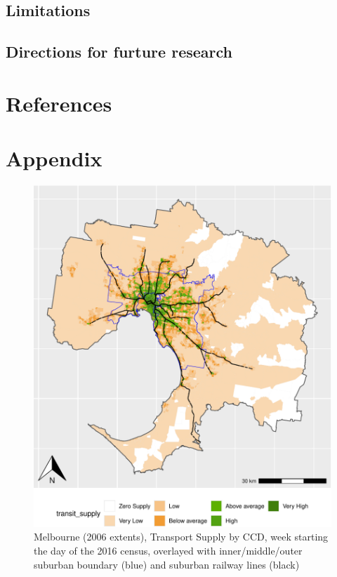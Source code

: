 \documentclass[preprint, 3p,
authoryear]{elsarticle} %
\begin{document}
\hypertarget{limitations}{%
\subsection{Limitations}\label{limitations}}

\hypertarget{directions-for-furture-research}{%
\subsection{Directions for furture
research}\label{directions-for-furture-research}}

\hypertarget{references}{%
\section*{References}\label{references}}

\hypertarget{appendix}{%
\section{Appendix}\label{appendix}}

\begin{figure}
\centering
\includegraphics{ReynoldsCurrieQu2024_files/figure-latex/Greater_Melbourne_CCD_2016_appendix-1.pdf}
\caption{Melbourne (2006 extents), Transport Supply by CCD, week
starting the day of the 2016 census, overlayed with inner/middle/outer
suburban boundary (blue) and suburban railway lines (black)}
\end{figure}
\end{document}
